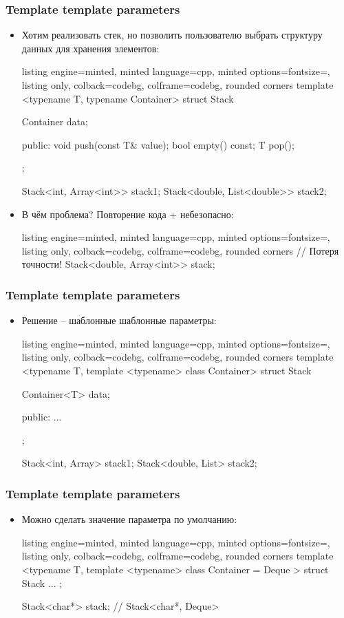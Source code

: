 \documentclass[10pt]{beamer}
\begin{document}
\begin{frame}[fragile]
\frametitle{Template template parameters}
\begin{itemize}
\item Хотим реализовать стек, но позволить пользователю выбрать структуру данных для хранения элементов:
\begin{tcblisting}{listing engine=minted, minted language=cpp, minted options={fontsize=\scriptsize}, listing only, colback=codebg, colframe=codebg, rounded corners}
template <typename T, typename Container>
struct Stack {
  Container data;

public:
  void push(const T& value);
  bool empty() const;
  T pop();
};

Stack<int, Array<int>> stack1;
Stack<double, List<double>> stack2;
\end{tcblisting}
\pause
\item В чём проблема? \pause Повторение кода + небезопасно:
\begin{tcblisting}{listing engine=minted, minted language=cpp, minted options={fontsize=\scriptsize}, listing only, colback=codebg, colframe=codebg, rounded corners}
// Потеря точности!
Stack<double, Array<int>> stack;
\end{tcblisting}
\end{itemize}
\end{frame}

\begin{frame}[fragile]
\frametitle{Template template parameters}
\begin{itemize}
\item Решение -- шаблонные шаблонные параметры:
\begin{tcblisting}{listing engine=minted, minted language=cpp, minted options={fontsize=\scriptsize}, listing only, colback=codebg, colframe=codebg, rounded corners}
template <typename T, template <typename> class Container>
struct Stack {
  Container<T> data;

public:
  ...
};

Stack<int, Array> stack1;
Stack<double, List> stack2;
\end{tcblisting}
\end{itemize}
\end{frame}

\begin{frame}[fragile]
\frametitle{Template template parameters}
\begin{itemize}
\item Можно сделать значение параметра по умолчанию:
\begin{tcblisting}{listing engine=minted, minted language=cpp, minted options={fontsize=\scriptsize}, listing only, colback=codebg, colframe=codebg, rounded corners}
template <typename T,
  template <typename> class Container = Deque
>
struct Stack { ... };

Stack<char*> stack; // Stack<char*, Deque>
\end{tcblisting}
\end{itemize}
\end{frame}
\end{document}
